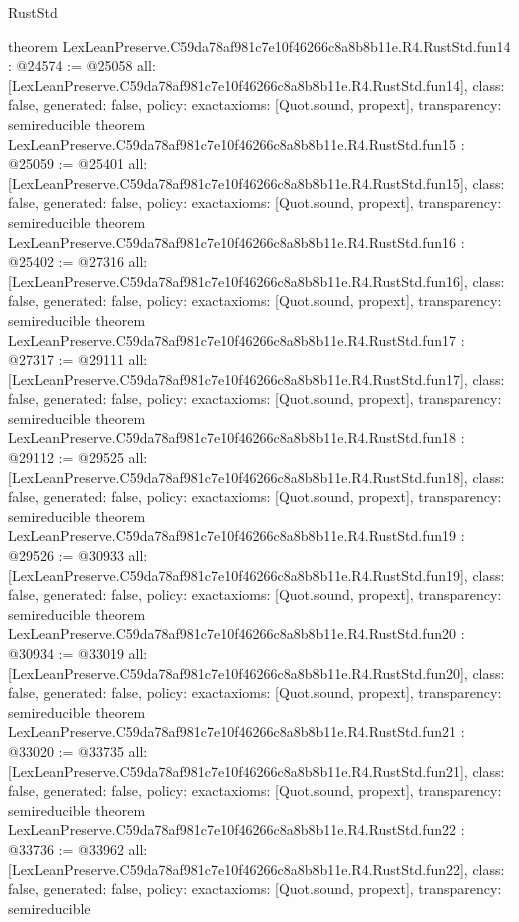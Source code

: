 \begin{lexlean}{RustStd}
\begin{coremodule}
{}
theorem LexLeanPreserve.C59da78af981c7e10f46266c8a8b8b11e.R4.RustStd.fun14 : @24574 := @25058 {
  all: [LexLeanPreserve.C59da78af981c7e10f46266c8a8b8b11e.R4.RustStd.fun14],
  class: false,
  generated: false,
  policy: exact{axioms: [Quot.sound, propext]},
  transparency: semireducible
}
theorem LexLeanPreserve.C59da78af981c7e10f46266c8a8b8b11e.R4.RustStd.fun15 : @25059 := @25401 {
  all: [LexLeanPreserve.C59da78af981c7e10f46266c8a8b8b11e.R4.RustStd.fun15],
  class: false,
  generated: false,
  policy: exact{axioms: [Quot.sound, propext]},
  transparency: semireducible
}
theorem LexLeanPreserve.C59da78af981c7e10f46266c8a8b8b11e.R4.RustStd.fun16 : @25402 := @27316 {
  all: [LexLeanPreserve.C59da78af981c7e10f46266c8a8b8b11e.R4.RustStd.fun16],
  class: false,
  generated: false,
  policy: exact{axioms: [Quot.sound, propext]},
  transparency: semireducible
}
theorem LexLeanPreserve.C59da78af981c7e10f46266c8a8b8b11e.R4.RustStd.fun17 : @27317 := @29111 {
  all: [LexLeanPreserve.C59da78af981c7e10f46266c8a8b8b11e.R4.RustStd.fun17],
  class: false,
  generated: false,
  policy: exact{axioms: [Quot.sound, propext]},
  transparency: semireducible
}
theorem LexLeanPreserve.C59da78af981c7e10f46266c8a8b8b11e.R4.RustStd.fun18 : @29112 := @29525 {
  all: [LexLeanPreserve.C59da78af981c7e10f46266c8a8b8b11e.R4.RustStd.fun18],
  class: false,
  generated: false,
  policy: exact{axioms: [Quot.sound, propext]},
  transparency: semireducible
}
theorem LexLeanPreserve.C59da78af981c7e10f46266c8a8b8b11e.R4.RustStd.fun19 : @29526 := @30933 {
  all: [LexLeanPreserve.C59da78af981c7e10f46266c8a8b8b11e.R4.RustStd.fun19],
  class: false,
  generated: false,
  policy: exact{axioms: [Quot.sound, propext]},
  transparency: semireducible
}
theorem LexLeanPreserve.C59da78af981c7e10f46266c8a8b8b11e.R4.RustStd.fun20 : @30934 := @33019 {
  all: [LexLeanPreserve.C59da78af981c7e10f46266c8a8b8b11e.R4.RustStd.fun20],
  class: false,
  generated: false,
  policy: exact{axioms: [Quot.sound, propext]},
  transparency: semireducible
}
theorem LexLeanPreserve.C59da78af981c7e10f46266c8a8b8b11e.R4.RustStd.fun21 : @33020 := @33735 {
  all: [LexLeanPreserve.C59da78af981c7e10f46266c8a8b8b11e.R4.RustStd.fun21],
  class: false,
  generated: false,
  policy: exact{axioms: [Quot.sound, propext]},
  transparency: semireducible
}
theorem LexLeanPreserve.C59da78af981c7e10f46266c8a8b8b11e.R4.RustStd.fun22 : @33736 := @33962 {
  all: [LexLeanPreserve.C59da78af981c7e10f46266c8a8b8b11e.R4.RustStd.fun22],
  class: false,
  generated: false,
  policy: exact{axioms: [Quot.sound, propext]},
  transparency: semireducible
}
\end{coremodule}
\end{lexlean}
